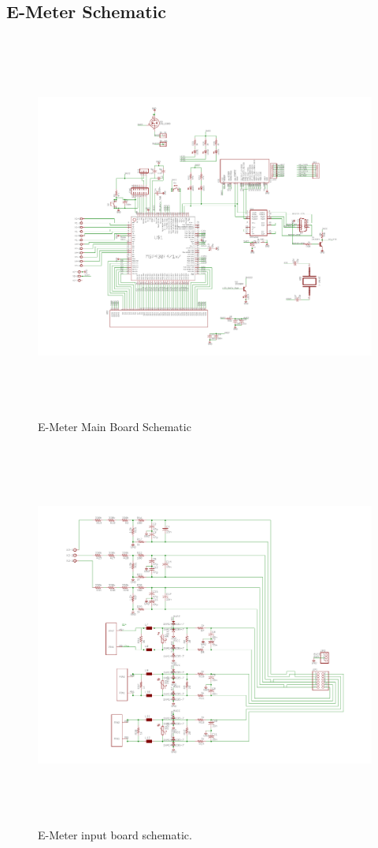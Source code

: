 \clearpage
\subsection{E-Meter Schematic}\label{sec:e_meter_schem}
\begin{figure}[htbp]
  \centering
  \includegraphics[height=5in, angle=90]{includes/E_Meter_Main_Schematic}
  \caption{E-Meter Main Board Schematic}
  \label{fig:e_meter_main_schematic_large}
\end{figure}

\begin{figure}[htbp]
  \centering
  \includegraphics[height=5in, angle=90]{includes/e_meter_input_board_schem_large}
  \caption{E-Meter input board schematic.}
  \label{fig:e_meter_input_schematic_large}
\end{figure}
\clearpage

